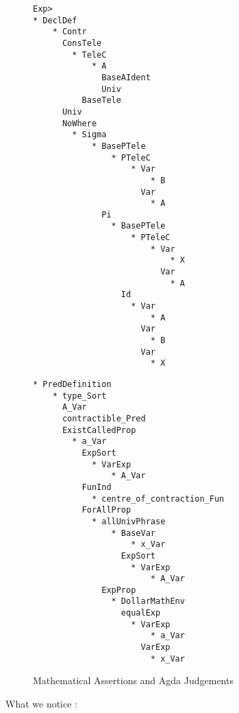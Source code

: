 \begin{figure}
\centering
\begin{minipage}[t]{.5\textwidth}
\begin{verbatim}
Exp> 
* DeclDef
    * Contr
      ConsTele
        * TeleC
            * A
              BaseAIdent
              Univ
          BaseTele
      Univ
      NoWhere
        * Sigma
            * BasePTele
                * PTeleC
                    * Var
                        * B
                      Var
                        * A
              Pi
                * BasePTele
                    * PTeleC
                        * Var
                            * X
                          Var
                            * A
                  Id
                    * Var
                        * A
                      Var
                        * B
                      Var
                        * X
\end{verbatim}
\end{minipage}%
\begin{minipage}[t]{.55\textwidth}
\begin{verbatim}
* PredDefinition
    * type_Sort
      A_Var
      contractible_Pred
      ExistCalledProp
        * a_Var
          ExpSort
            * VarExp
                * A_Var
          FunInd
            * centre_of_contraction_Fun
          ForAllProp
            * allUnivPhrase
                * BaseVar
                    * x_Var
                  ExpSort
                    * VarExp
                        * A_Var
              ExpProp
                * DollarMathEnv
                  equalExp
                    * VarExp
                        * a_Var
                      VarExp
                        * x_Var
\end{verbatim}
\end{minipage}
\caption{Mathematical Assertions and Agda Judgements} \label{fig:I2}
\end{figure}

What we notice : 


